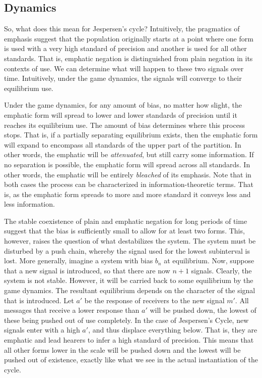 \subsection{Dynamics}

So, what does this mean for Jespersen's cycle? Intuitively, the pragmatics of emphasis suggest that the population originally starts at a point where one form is used with a  very high standard of precision and another is used for all other standards. That is, emphatic negation is distinguished from plain negation in its contexts of use. We can determine what will happen to these two signals over time. Intuitively, under the game dynamics, the signals will converge to their equilibrium use.

Under the game dynamics, for any amount of bias, no matter how slight, the emphatic form will spread to lower and lower standards of precision until it reaches its equilibrium use. The amount of bias determines where this process stops. That is, if a partially separating equilibrium exists, then the emphatic form will expand to encompass all standards of the upper part of the partition. In other words, the emphatic will be \emph{attenuated}, but still carry some information.  If no separation is possible, the emphatic form will spread across all standards. In other words, the emphatic will be entirely \emph{bleached} of its emphasis. Note that in both cases the process can be characterized in information-theoretic terms. That is, as the emphatic form spreads to more and more standard it conveys less and less information. 

The stable coexistence of plain and emphatic negation for long periods of time suggest that the bias is sufficiently small to allow for at least two forms. This, however, raises the question of what destabilizes the system. The system must be disturbed by a push chain, whereby the signal used for the lowest subinterval is lost. More generally, imagine a system with bias $b_n$ at equilibrium. Now, suppose that a new signal is introduced, so that there are now $n+1$ signals. Clearly, the system is not stable. However, it will be carried back to some equilibrium by the game dynamics. The resultant equilibrium depends on the character of the signal that is introduced. Let $a'$ be the response of receivers to the new signal $m'$. All messages that receive a lower response than $a'$ will be pushed down, the lowest of these being pushed out of use completely.  In the case of Jespersen's Cycle, new signals enter with a high $a'$, and thus displace everything below. That is, they are emphatic and lead hearers to 
infer a high standard of precision. This means that all other forms lower in the scale will be pushed down and the lowest will be pushed out of existence, exactly like what we see in the actual instantiation of the cycle.

